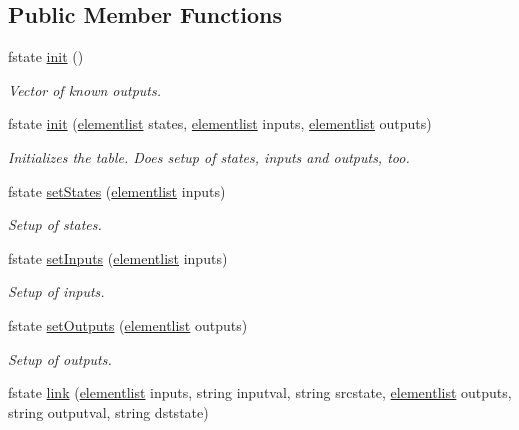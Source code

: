 \subsection*{Public Member Functions}
\begin{DoxyCompactItemize}
\item 
fstate \mbox{\hyperlink{classsmtable_ae475d729d11ec8e097c5750bfe6eafbf}{init}} ()
\begin{DoxyCompactList}\small\item\em Vector of known outputs. \end{DoxyCompactList}\item 
fstate \mbox{\hyperlink{classsmtable_a762560d078b904bfdcd55262db8f3fe8}{init}} (\mbox{\hyperlink{classsmtable_a5eb5f5f14b1e52a2bde73255ea71927f}{elementlist}} states, \mbox{\hyperlink{classsmtable_a5eb5f5f14b1e52a2bde73255ea71927f}{elementlist}} inputs, \mbox{\hyperlink{classsmtable_a5eb5f5f14b1e52a2bde73255ea71927f}{elementlist}} outputs)
\begin{DoxyCompactList}\small\item\em Initializes the table. Does setup of states, inputs and outputs, too. \end{DoxyCompactList}\item 
fstate \mbox{\hyperlink{classsmtable_a37b9d34c2bec60d3f23ba53afc9dc0fb}{set\+States}} (\mbox{\hyperlink{classsmtable_a5eb5f5f14b1e52a2bde73255ea71927f}{elementlist}} inputs)
\begin{DoxyCompactList}\small\item\em Setup of states. \end{DoxyCompactList}\item 
fstate \mbox{\hyperlink{classsmtable_a594f4033166c44e95e5456682135bfa8}{set\+Inputs}} (\mbox{\hyperlink{classsmtable_a5eb5f5f14b1e52a2bde73255ea71927f}{elementlist}} inputs)
\begin{DoxyCompactList}\small\item\em Setup of inputs. \end{DoxyCompactList}\item 
fstate \mbox{\hyperlink{classsmtable_a835fa1dd5ab840ff16741870c6758dc2}{set\+Outputs}} (\mbox{\hyperlink{classsmtable_a5eb5f5f14b1e52a2bde73255ea71927f}{elementlist}} outputs)
\begin{DoxyCompactList}\small\item\em Setup of outputs. \end{DoxyCompactList}\item 
fstate \mbox{\hyperlink{classsmtable_a0de3a6992dca6fa12027e14a74d14171}{link}} (\mbox{\hyperlink{classsmtable_a5eb5f5f14b1e52a2bde73255ea71927f}{elementlist}} inputs, string inputval, string srcstate, \mbox{\hyperlink{classsmtable_a5eb5f5f14b1e52a2bde73255ea71927f}{elementlist}} outputs, string outputval, string dststate)

\end{DoxyCompactItemize}
